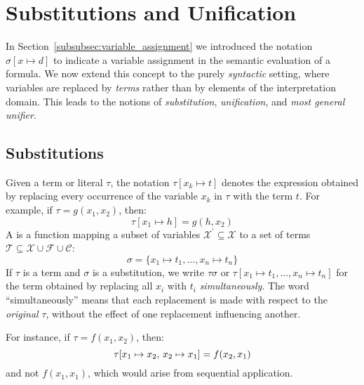\section{Substitutions and Unification}\label{sec:substitutions-and-unification}
In Section~\ref{subsubsec:variable_assignment} we introduced the notation \(\sigma[x \mapsto d]\) to indicate a variable assignment in the semantic evaluation of a formula. We now extend this concept to the purely \emph{syntactic} setting, where variables are replaced by \emph{terms} rather than by elements of the interpretation domain. This leads to the notions of \emph{substitution}, \emph{unification}, and \emph{most general unifier}.

\subsection{Substitutions}\label{subsec:substitutions}
Given a term or literal \(\tau\), the notation \(\tau[x_k \mapsto t]\) denotes the expression obtained by replacing every occurrence of the variable \(x_k\) in \(\tau\) with the term \(t\).  
For example, if \(\tau = g(x_1, x_2)\), then:
\begin{equation}
\tau[x_1 \mapsto h] = g(h, x_2)
\end{equation}
A  is a function mapping a subset of variables \(\mathcal{X}^{'} \subseteq \mathcal{X}\) to a set of terms \(\mathcal{T} \subseteq \mathcal{X} \cup \mathcal{F} \cup \mathcal{C}\):
\begin{equation}
\sigma = \{ x_1\mapsto t_1, \ldots, x_n\mapsto t_n \}
\end{equation}
If \(\tau\) is a term and \(\sigma\) is a substitution, we write \(\tau\sigma\) or \(\tau[x_1 \mapsto t_1, \ldots, x_n \mapsto t_n]\) for the term obtained by replacing all \(x_i\) with \(t_i\) \emph{simultaneously}.  
The word “simultaneously” means that each replacement is made with respect to the \emph{original} \(\tau\), without the effect of one replacement influencing another.

For instance, if \(\tau = f(x_1, x_2)\), then:
\begin{equation}
\tau[x_1 \mapsto x_2,  \,  x_2 \mapsto x_1] = f(x_2, x_1)
\end{equation}
and not \(f(x_1, x_1)\), which would arise from sequential application.

